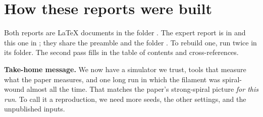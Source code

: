 \section{How these reports were built}
Both reports are \LaTeX{} documents in the folder . The expert report is in  and this one in ; they share the preamble  and the folder .
To rebuild one, run  twice in its folder. The second pass fills in the table of contents and cross-references.

\vspace{1em}
\begin{keybox}
\textbf{Take-home message.} We now have a simulator we trust, tools that measure what the paper measures, and one long run in which the filament was spiral-wound almost all the time.
That matches the paper's strong-spiral picture \emph{for this run}. To call it a reproduction, we need more seeds, the other settings, and the unpublished inputs.
\end{keybox}
